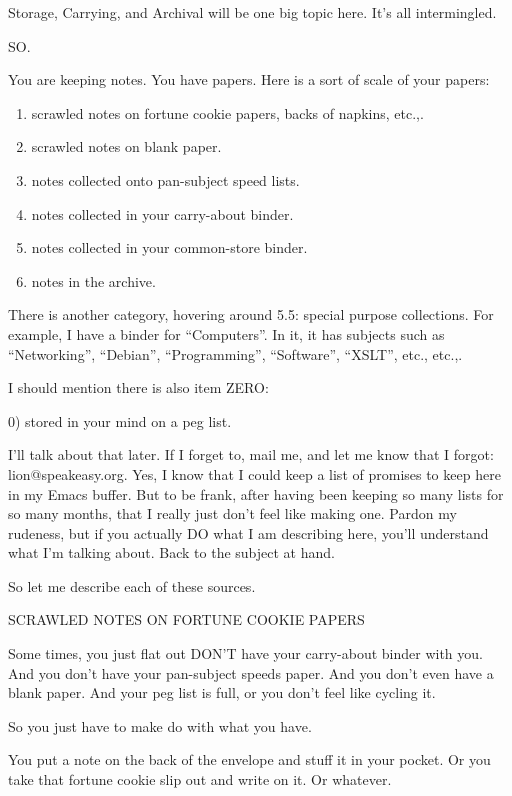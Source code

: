 \documentclass[oneside]{book}
\begin{document}
Storage, Carrying, and Archival will be one big topic here. It's all
intermingled.

SO.

You are keeping notes. You have papers. Here is a sort of scale of
your papers:

\begin{enumerate}
\item scrawled notes on fortune cookie papers, backs of napkins, etc.,.
\item scrawled notes on blank paper.
\item notes collected onto pan-subject speed lists.
\item notes collected in your carry-about binder.
\item notes collected in your common-store binder.
\item notes in the archive.
\end{enumerate}

There is another category, hovering around 5.5: special purpose
collections. For example, I have a binder for ``Computers''. In it, it
has subjects such as ``Networking'', ``Debian'', ``Programming'',
``Software'', ``XSLT'', etc., etc.,.

I should mention there is also item ZERO:

0) stored in your mind on a peg list.

I'll talk about that later. If I forget to, mail me, and let me know
that I forgot: lion@speakeasy.org. Yes, I know that I could keep a
list of promises to keep here in my Emacs buffer. But to be frank,
after having been keeping so many lists for so many months, that I
really just don't feel like making one. Pardon my rudeness, but if you
actually DO what I am describing here, you'll understand what I'm
talking about. Back to the subject at hand.

So let me describe each of these sources.

SCRAWLED NOTES ON FORTUNE COOKIE PAPERS

Some times, you just flat out DON'T have your carry-about binder
with you. And you don't have your pan-subject speeds paper. And you
don't even have a blank paper. And your peg list is full, or you don't
feel like cycling it.

So you just have to make do with what you have.

You put a note on the back of the envelope and stuff it in your
pocket. Or you take that fortune cookie slip out and write on it. Or
whatever.
\end{document}
